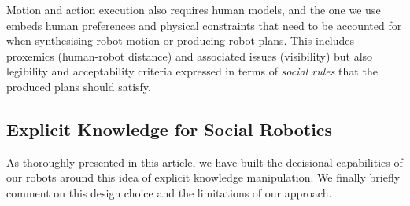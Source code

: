 \documentclass[preprint,3p,times]{elsarticle}
\newcommand{\eg}{e.g.\xspace}
\begin{document}
Motion and action execution also requires human models, and the one we use
embeds human preferences and physical constraints that need to be accounted for
when synthesising robot motion or producing robot plans. This includes
proxemics (human-robot distance) and associated issues (visibility) but also
legibility and acceptability criteria expressed in terms of \emph{social rules}
that the produced plans should satisfy.

%
%


\subsection{Explicit Knowledge for Social Robotics}
\label{krs-discussion}

As thoroughly presented in this article, we have built the decisional
capabilities of our robots around this idea of explicit knowledge manipulation.
We finally briefly comment on this design choice and the limitations of our
approach.
\end{document}
